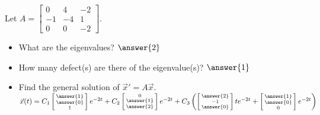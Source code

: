 \documentclass{ximera}
\begin{document}
\begin{exercise}
    Let $A = 
    \left[ 
        \begin{smallmatrix}
            0 & 4 & -2 \\
            -1 & -4 & 1 \\
            0 & 0 & -2
        \end{smallmatrix} 
    \right]$.
    \begin{itemize}
        \item What are the eigenvalues? $\answer{2}$
        \item How many defect(s) are there of the eigenvalue(s)? $\answer{1}$
        \item Find the general solution of ${\vec{x}}' = A \vec{x}$.\\
            $\vec{x}(t) = C_1 \left[\begin{smallmatrix} \answer{1} \\ \answer{0} \\ 1 \end{smallmatrix}\right]e^{-2t} + C_2\left[\begin{smallmatrix} 0 \\ \answer{1} \\ \answer{2} \end{smallmatrix}\right]e^{-2t} + C_3\left( \left[\begin{smallmatrix} \answer{2} \\ -1 \\ \answer{0} \end{smallmatrix}\right]te^{-2t} + \left[\begin{smallmatrix} \answer{1} \\ \answer{0} \\ 0 \end{smallmatrix}\right]e^{-2t}\right)$
    \end{itemize}
\end{exercise}
\end{document}
